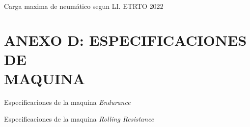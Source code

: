 \begin{table}[H]
	\centering
	\caption{Carga maxima de neumático segun LI. ETRTO 2022}
	
\end{table}

\section{ANEXO D: ESPECIFICACIONES DE\\ MAQUINA}\label{apnd5}

\begin{table}[H]
	\centering
	\caption{Especificaciones de la maquina \textit{Endurance}}
	
\end{table}

\begin{table}[H]
	\centering
	\caption{Especificaciones de la maquina \textit{Rolling Resistance}}
	
\end{table}
